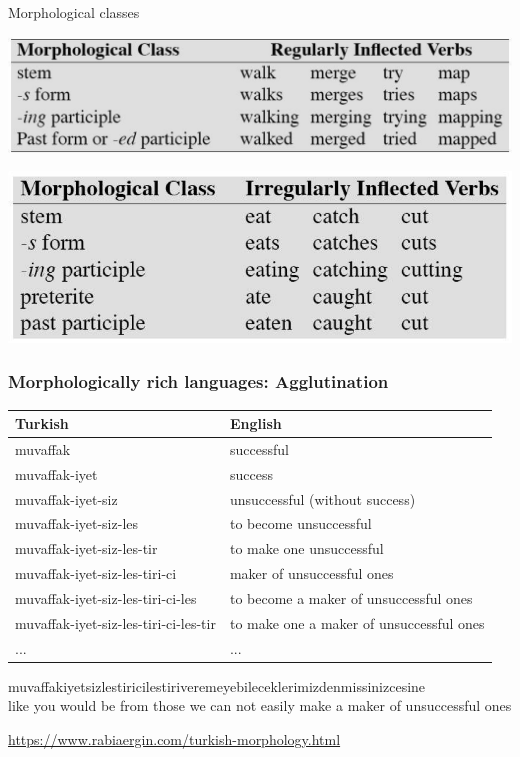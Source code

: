 \documentclass{beamer}
\begin{document}

\begin{frame}{Morphological classes}

  \includegraphics[width=.8\textwidth]{figures/morph-class-reg}

  \includegraphics[width=.8\textwidth]{figures/morph-class-irreg}
\end{frame}


\begin{frame}
\frametitle{Morphologically rich languages: Agglutination}
\small
\begin{tabular}{l|l}
Turkish & English\\
\hline
muvaffak & successful \\
muvaffak-iyet & success\\ 
muvaffak-iyet-siz & unsuccessful (without success) \\
muvaffak-iyet-siz-les & to become unsuccessful \\
muvaffak-iyet-siz-les-tir & to make one unsuccessful \\
muvaffak-iyet-siz-les-tiri-ci & maker of unsuccessful ones \\
muvaffak-iyet-siz-les-tiri-ci-les & to become a maker of unsuccessful ones \\
muvaffak-iyet-siz-les-tiri-ci-les-tir & to make one a maker of unsuccessful ones \\
... & ... \\
\end{tabular}

{\tiny
  muvaffakiyetsizlestiricilestiriveremeyebileceklerimizdenmissinizcesine
  \\ like you would be from those we can not easily make a maker of
  unsuccessful ones}

\url{https://www.rabiaergin.com/turkish-morphology.html}
\end{frame}
\end{document}
